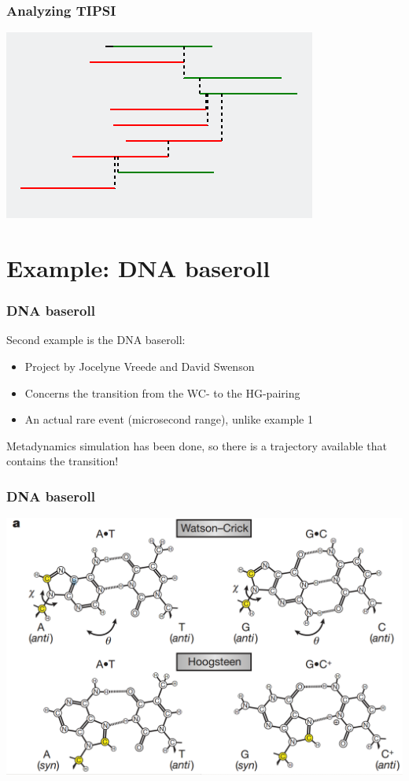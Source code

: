 \documentclass[hyperref={pdfpagelabels=false}]{beamer}
\begin{document}
\begin{frame}
\frametitle{Analyzing \textsc{TIPSI}} 
\begin{center}
\includegraphics[scale=1]{images/tree.png}
\end{center}
\end{frame}

\section{Example: DNA baseroll}
\setcounter{subsection}{1}


\begin{frame}
\frametitle{DNA baseroll} 
Second example is the DNA baseroll:
\begin{itemize}
\item Project by Jocelyne Vreede and David Swenson
\item Concerns the transition from the WC- to the HG-pairing
\item An actual rare event (microsecond range), unlike example 1
\end{itemize}
Metadynamics simulation has been done, so there is a trajectory available that contains the transition!
\end{frame}

\begin{frame}
\frametitle{DNA baseroll} 
\begin{center}
\includegraphics[scale=0.2]{images/pairing.png}
\end{center}
\end{frame}
\end{document}
